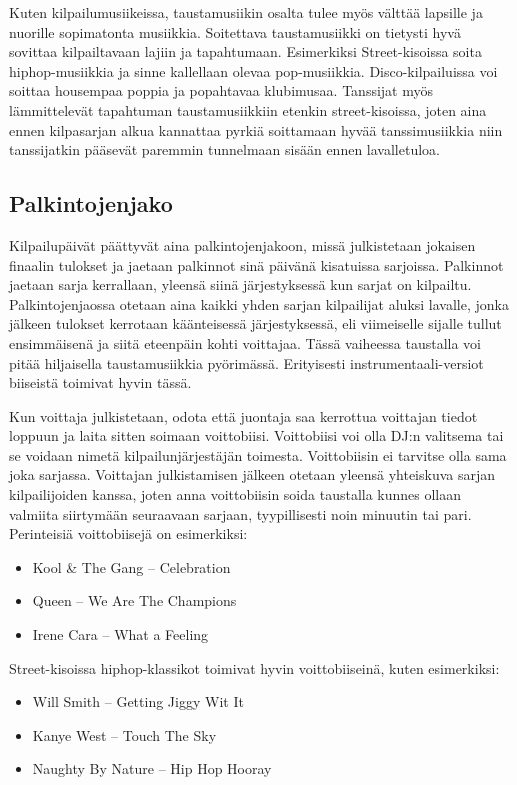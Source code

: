 \documentclass[12pt, a4paper, oneside]{article}
\begin{document}
Kuten kilpailumusiikeissa,
taustamusiikin osalta tulee myös välttää lapsille ja nuorille sopimatonta musiikkia.
Soitettava taustamusiikki on tietysti hyvä sovittaa kilpailtavaan lajiin ja tapahtumaan.
Esimerkiksi Street-kisoissa soita hiphop-musiikkia ja sinne kallellaan olevaa pop-musiikkia.
Disco-kilpailuissa voi soittaa housempaa poppia ja popahtavaa klubimusaa.
Tanssijat myös lämmittelevät tapahtuman taustamusiikkiin etenkin street-kisoissa,
joten aina ennen kilpasarjan alkua kannattaa pyrkiä soittamaan hyvää tanssimusiikkia niin tanssijatkin pääsevät paremmin tunnelmaan sisään ennen lavalletuloa.

\subsection{Palkintojenjako} \label{subsec:palkintojenjako}

Kilpailupäivät päättyvät aina palkintojenjakoon,
missä julkistetaan jokaisen finaalin tulokset ja jaetaan palkinnot sinä päivänä kisatuissa sarjoissa.
Palkinnot jaetaan sarja kerrallaan,
yleensä siinä järjestyksessä kun sarjat on kilpailtu.
Palkintojenjaossa otetaan aina kaikki yhden sarjan kilpailijat aluksi lavalle,
jonka jälkeen tulokset kerrotaan käänteisessä järjestyksessä,
eli viimeiselle sijalle tullut ensimmäisenä ja siitä eteenpäin kohti voittajaa.
Tässä vaiheessa taustalla voi pitää hiljaisella taustamusiikkia pyörimässä.
Erityisesti instrumentaali-versiot biiseistä toimivat hyvin tässä.

Kun voittaja julkistetaan,
odota että juontaja saa kerrottua voittajan tiedot loppuun ja laita sitten soimaan voittobiisi.
Voittobiisi voi olla DJ:n valitsema tai se voidaan nimetä kilpailunjärjestäjän toimesta.
Voittobiisin ei tarvitse olla sama joka sarjassa.
Voittajan julkistamisen jälkeen otetaan yleensä yhteiskuva sarjan kilpailijoiden kanssa,
joten anna voittobiisin soida taustalla kunnes ollaan valmiita siirtymään seuraavaan sarjaan,
tyypillisesti noin minuutin tai pari.
Perinteisiä voittobiisejä on esimerkiksi:
\begin{itemize}[nosep]
    \item Kool \& The Gang -- Celebration
    \item Queen -- We Are The Champions
    \item Irene Cara -- What a Feeling
\end{itemize}

Street-kisoissa hiphop-klassikot toimivat hyvin voittobiiseinä,
kuten esimerkiksi:
\begin{itemize}[nosep]
    \item Will Smith -- Getting Jiggy Wit It
    \item Kanye West -- Touch The Sky
    \item Naughty By Nature -- Hip Hop Hooray
\end{itemize}
\end{document}
